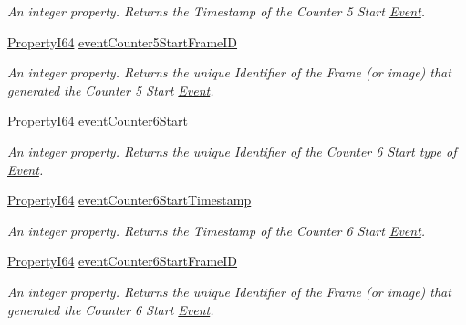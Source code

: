\begin{DoxyCompactItemize}
\begin{DoxyCompactList}\small\item\em An integer property. Returns the Timestamp of the Counter 5 Start \hyperlink{classmv_i_m_p_a_c_t_1_1acquire_1_1_event}{Event}. \end{DoxyCompactList}\item 
\hyperlink{group___common_interface_ga81749b2696755513663492664a18a893}{Property\+I64} \hyperlink{classmv_i_m_p_a_c_t_1_1acquire_1_1_gen_i_cam_1_1_event_control_a224f3b265beab6a9c3476d204132b394}{event\+Counter5\+Start\+Frame\+I\+D}
\begin{DoxyCompactList}\small\item\em An integer property. Returns the unique Identifier of the Frame (or image) that generated the Counter 5 Start \hyperlink{classmv_i_m_p_a_c_t_1_1acquire_1_1_event}{Event}. \end{DoxyCompactList}\item 
\hyperlink{group___common_interface_ga81749b2696755513663492664a18a893}{Property\+I64} \hyperlink{classmv_i_m_p_a_c_t_1_1acquire_1_1_gen_i_cam_1_1_event_control_a4b6564d7ef97ba5ffe3545845f56c2f2}{event\+Counter6\+Start}
\begin{DoxyCompactList}\small\item\em An integer property. Returns the unique Identifier of the Counter 6 Start type of \hyperlink{classmv_i_m_p_a_c_t_1_1acquire_1_1_event}{Event}. \end{DoxyCompactList}\item 
\hyperlink{group___common_interface_ga81749b2696755513663492664a18a893}{Property\+I64} \hyperlink{classmv_i_m_p_a_c_t_1_1acquire_1_1_gen_i_cam_1_1_event_control_ab24afa90c18eaadacfd85dafda799599}{event\+Counter6\+Start\+Timestamp}
\begin{DoxyCompactList}\small\item\em An integer property. Returns the Timestamp of the Counter 6 Start \hyperlink{classmv_i_m_p_a_c_t_1_1acquire_1_1_event}{Event}. \end{DoxyCompactList}\item 
\hyperlink{group___common_interface_ga81749b2696755513663492664a18a893}{Property\+I64} \hyperlink{classmv_i_m_p_a_c_t_1_1acquire_1_1_gen_i_cam_1_1_event_control_ae45883f01fa45a36a2e6e6532f3bcb74}{event\+Counter6\+Start\+Frame\+I\+D}
\begin{DoxyCompactList}\small\item\em An integer property. Returns the unique Identifier of the Frame (or image) that generated the Counter 6 Start \hyperlink{classmv_i_m_p_a_c_t_1_1acquire_1_1_event}{Event}. \end{DoxyCompactList}\item 

\end{DoxyCompactItemize}
